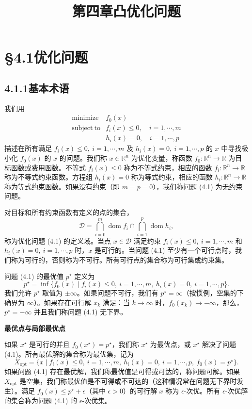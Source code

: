 \documentclass[UTF8,12pt,a4paper,fontset=fandol]{ctexart}
\title{第四章\quad 凸优化问题}
\author{}
\date{}
\begin{document}
\maketitle

\section*{§4.1\quad 优化问题}

\subsection*{4.1.1\quad 基本术语}

我们用
\begin{equation}
\begin{array}{ll}
\mathop{\mathrm{minimize}} & f_0(x)\\
\mathrm{subject\ to} & f_i(x)\leq 0,\quad i=1,\cdots,m\\
& h_i(x)=0,\quad i=1,\cdots,p
\end{array}
\tag{4.1}
\end{equation}
描述在所有满足 $f_i(x)\leq 0,\ i=1,\cdots,m$ 及 $h_i(x)=0,\ i=1,\cdots,p$ 的 $x$ 中寻找极小化 $f_0(x)$ 的 $x$ 的问题。我们称 $x\in\mathbb{R}^n$ 为优化变量，称函数 $f_0:\mathbb{R}^n\to\mathbb{R}$ 为目标函数或费用函数。不等式 $f_i(x)\leq 0$ 称为不等式约束，相应的函数 $f_i:\mathbb{R}^n\to\mathbb{R}$ 称为不等式约束函数。方程组 $h_i(x)=0$ 称为等式约束，相应的函数 $h_i:\mathbb{R}^n\to\mathbb{R}$ 称为等式约束函数。如果没有约束（即 $m=p=0$），我们称问题 (4.1) 为无约束问题。

对目标和所有约束函数有定义的点的集合，
\[
\mathcal{D}=\bigcap_{i=0}^{m}\operatorname{dom} f_i\cap\bigcap_{i=1}^{p}\operatorname{dom} h_i,
\]
称为优化问题 (4.1) 的定义域。当点 $x\in\mathcal{D}$ 满足约束 $f_i(x)\leq 0,\ i=1,\cdots,m$ 和 $h_i(x)=0,\ i=1,\cdots,p$ 时，$x$ 是可行的。当问题 (4.1) 至少有一个可行点时，我们称为可行的，否则称为不可行。所有可行点的集合称为可行集或约束集。

问题 (4.1) 的最优值 $p^\star$ 定义为
\[
p^\star=\inf\{f_0(x)\mid f_i(x)\leq 0,\ i=1,\cdots,m,\ h_i(x)=0,\ i=1,\cdots,p\}.
\]
我们允许 $p^\star$ 取值为 $\pm\infty$。如果问题不可行，我们有 $p^\star=\infty$（按惯例，空集的下确界为 $\infty$）。如果存在可行解 $x_k$ 满足：当 $k\to\infty$ 时，$f_0(x_k)\to-\infty$，那么，$p^\star=-\infty$ 并且我们称问题 (4.1) 无下界。

\noindent\textbf{最优点与局部最优点}

如果 $x^\star$ 是可行的并且 $f_0(x^\star)=p^\star$，我们称 $x^\star$ 为最优点，或 $x^\star$ 解决了问题 (4.1)。所有最优解的集合称为最优集，记为
\[
X_{\mathrm{opt}}=\{x\mid f_i(x)\leq 0,\ i=1,\cdots,m,\ h_i(x)=0,\ i=1,\cdots,p,\ f_0(x)=p^\star\}.
\]
如果问题 (4.1) 存在最优解，我们称最优值是可得或可达的，称问题可解。如果 $X_{\mathrm{opt}}$ 是空集，我们称最优值是不可得或不可达的（这种情况常在问题无下界时发生）。满足 $f_0(x)\leq p^\star+\epsilon$（其中 $\epsilon>0$）的可行解 $x$ 称为 $\epsilon$-次优。所有 $\epsilon$-次优解的集合称为问题 (4.1) 的 $\epsilon$-次优集。
\end{document}

